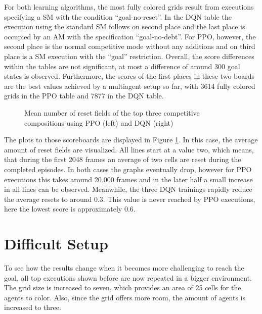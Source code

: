 For both learning algorithms, the most fully colored grids result from executions specifying a SM with the condition ``goal-no-reset''. In the DQN table the execution using the standard SM follows on second place and the last place is occupied by an AM with the specification ``goal-no-debt''. For PPO, however, the second place is the normal competitive mode without any additions and on third place is a SM execution with the ``goal'' restriction. Overall, the score differences within the tables are not significant, at most a difference of around 300 goal states is observed. Furthermore, the scores of the first places in these two boards are the best values achieved by a multiagent setup so far, with 3614 fully colored grids in the PPO table and 7877 in the DQN table.

\begin{figure}[hpbt]
    \centering
    \hspace{0.01\textwidth}
    \caption[Mean Number of Reset Fields of the Top Competitive Modes in a 5x5 Environment]{Mean number of reset fields of the top three competitive compositions using PPO (left) and DQN (right)}
    \label{fig:multipic_plots_comp_easy}
\end{figure}

The plots to those scoreboards are displayed in Figure \ref{fig:multipic_plots_comp_easy}. In this case, the average amount of reset fields are visualized. All lines start at a value two, which means, that during the first 2048 frames an average of two cells are reset during the completed episodes. In both cases the graphs eventually drop, however for PPO executions this takes around 20.000 frames and in the later half a small increase in all lines can be observed. Meanwhile, the three DQN trainings rapidly reduce the average resets to around 0.3. This value is never reached by PPO executions, here the lowest score is approximately 0.6.

\section{Difficult Setup} \label{difficult_env}
To see how the results change when it becomes more challenging to reach the goal, all top executions shown before are now repeated in a bigger environment. The grid size is increased to seven, which provides an area of 25 cells for the agents to color. Also, since the grid offers more room, the amount of agents is increased to three.

